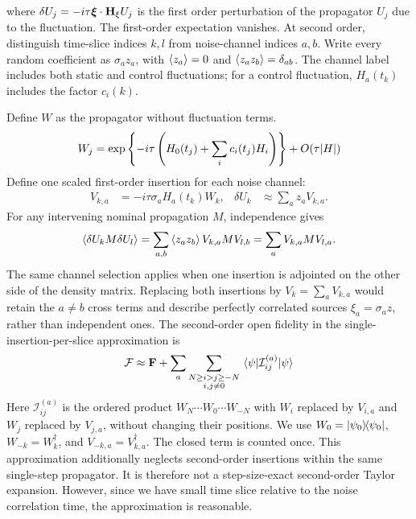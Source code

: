 \documentclass{simple-notes}
\newcommand{\closef}{\mathbf{F}}
\newcommand{\openf}{\mathcal{F}}
\begin{document}
where $\delta U_j = -i\tau\vb*\xi\cdot \vb H_{\xi}U_j$ is the first order perturbation of the propagator $U_j$ due to the fluctuation.
The first-order expectation vanishes. At second order, distinguish time-slice
indices $k,l$ from noise-channel indices $a,b$. Write every random coefficient
as $\sigma_a z_a$, with $\expval{z_a}=0$ and $\expval{z_a z_b}=\delta_{ab}$.
The channel label includes both static and control fluctuations; for a control
fluctuation, $H_a(t_k)$ includes the factor $c_i(k)$.

Define $W$ as the propagator without fluctuation terms.
\begin{equation}
    W_j = \exp\left\{-i\tau \left(H_0(t_j) + \sum_{i} c_i(t_j) H_i \right)\right\} + O(\tau \abs{H})
\end{equation}
Define one scaled first-order insertion for each noise channel:
\begin{align}
V_{k,a} &= -i\tau\sigma_a H_a(t_k)W_k,
&\delta U_k &\approx \sum_a z_a V_{k,a}.
\end{align}
For any intervening nominal propagation $M$, independence gives
\begin{equation}
\expval{\delta U_k M\delta U_l}
=\sum_{a,b}\expval{z_a z_b}V_{k,a}MV_{l,b}
=\sum_a V_{k,a}MV_{l,a}.
\end{equation}
The same channel selection applies when one insertion is adjointed on the
other side of the density matrix. Replacing both insertions by
$V_k=\sum_a V_{k,a}$ would retain the $a\ne b$ cross terms and describe
perfectly correlated sources $\xi_a=\sigma_a z$, rather than independent ones.
The second-order open fidelity in the single-insertion-per-slice approximation is
\begin{equation}
    \openf \approx \closef + \sum_a\sum_{\substack{N\geq i>j\geq-N\\i,j\neq0}} \mel{\psi}{\mathcal I_{ij}^{(a)}}{\psi}
    \label{eq:fluc_expansion_a}
\end{equation}
Here $\mathcal I_{ij}^{(a)}$ is the ordered product
$W_N\cdots W_0\cdots W_{-N}$ with $W_i$ replaced by $V_{i,a}$ and
$W_j$ replaced by $V_{j,a}$, without changing their positions.
We use $W_0 = \ketbra{\psi_0}$, $W_{-k}=W_k^\dagger$, and
$V_{-k,a}=V_{k,a}^\dagger$. The closed term is counted once.
This approximation additionally neglects second-order insertions within the
same single-step propagator. It is therefore not a step-size-exact second-order
Taylor expansion. However, since we have small time slice relative to the noise correlation time, the approximation is reasonable. 
\end{document}

